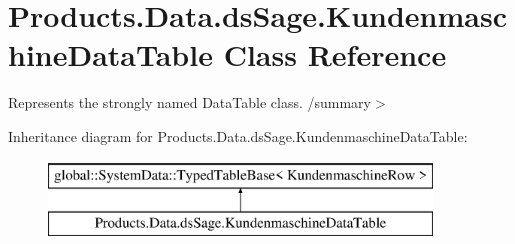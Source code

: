 \hypertarget{class_products_1_1_data_1_1ds_sage_1_1_kundenmaschine_data_table}{}\section{Products.\+Data.\+ds\+Sage.\+Kundenmaschine\+Data\+Table Class Reference}
\label{class_products_1_1_data_1_1ds_sage_1_1_kundenmaschine_data_table}


Represents the strongly named Data\+Table class. /summary$>$  


Inheritance diagram for Products.\+Data.\+ds\+Sage.\+Kundenmaschine\+Data\+Table\+:\begin{figure}[H]
\begin{center}
\leavevmode
\includegraphics[height=2.000000cm]{class_products_1_1_data_1_1ds_sage_1_1_kundenmaschine_data_table}
\end{center}
\end{figure}
